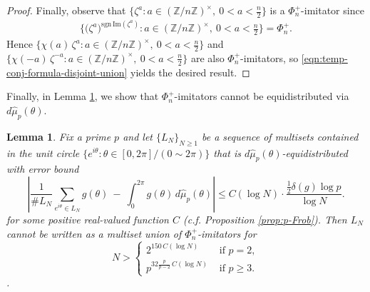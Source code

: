 \documentclass[11pt,letterpaper,reqno]{amsart}
\newtheorem{lemma}[theorem]{Lemma}
\theoremstyle{definition}
\numberwithin{equation}{section}
\numberwithin{figure}{section}
\numberwithin{table}{section}
\newcommand{\ZZ}{\mathbb{Z}}
\renewcommand{\Im}{\mathrm{Im}}
\begin{document}
\begin{proof}
Finally, observe that $\big\{\zeta^a : a \in (\ZZ/n\ZZ)^{\times},\ 0 < a < \tfrac{n}{2} \big\}$ is a $\Phi_n^+$-imitator since
\begin{align}
    \Big\{ \big(\zeta^a\big)^{\mathrm{sgn}\,\Im(\zeta^a)} :  a \in (\ZZ/n\ZZ)^{\times},\ 0 < a < \tfrac{n}{2} \Big\} = \Phi_n^+.\label{eqn:temp-set-equal-to-Phi_n+} 
\end{align}
Hence $\big\{\chi(a)\,\zeta^a : a \in (\ZZ/n\ZZ)^{\times},\ 0 < a < \tfrac{n}{2} \big\}$ 
and 
$\big\{\chi(-a)\,\zeta^{-a} : a \in (\ZZ/n\ZZ)^{\times},\ 0 < a < \tfrac{n}{2} \big\}$ 
are also $\Phi_n^+$-imitators, so \eqref{eqn:temp-conj-formula-disjoint-union}
yields the desired result.
\end{proof}



Finally, in Lemma \ref{lem:cyclotomic_obstruction}, we show that $\Phi_n^+$-imitators cannot be equidistributed via $d\hat \mu_p(\theta)$.
\begin{lemma}\label{lem:cyclotomic_obstruction}
    Fix a prime $p$ and let $\{L_N\}_{N\ge 1}$ be a sequence of multisets contained in the unit circle $\{e^{i\theta} : \theta \in [0,2\pi]/(0\sim2\pi)\}$ that is $d\hat \mu_p(\theta)$-equidistributed with error bound
    \begin{equation}
        \left| \frac{1}{\# L_N} \sum_{e^{i\theta} \in L_N} g( \theta) \ -\  \int_{0}^{2\pi} g(\theta) \,d\hat{\mu}_p(\theta) \right| \le C(\log N) \cdot  \frac{\frac{1}{2} \delta(g)\log p}{\log N}. 
        \label{eqn:main-thm-for-general-function-g-restated-forr-supersingularity}
    \end{equation}
    for some positive real-valued function $C$ (c.f. Proposition \ref{prop:p-Frob}). Then $L_N$ cannot be written as a multiset union of $\Phi_n^+$-imitators for 
    $$
    N >
    \begin{cases}
         2^{150 \, C(\log N)} 
        & \text{ if } p=2, \\
        p^{ 32\frac{p}{p-2} \, C(\log N)}
        & \text{ if } p \geq 3.
    \end{cases}
    $$.
\end{lemma}
\end{document}
